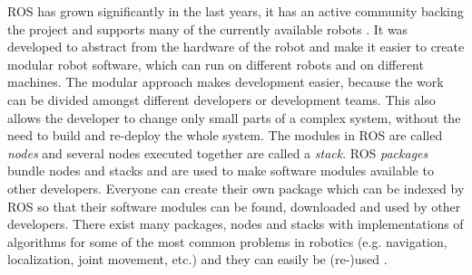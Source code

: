 \begin{figure}[ht]
\centering
{}
\end{figure}

ROS has grown significantly in the last years, it has an active community backing the project and supports many of the currently available robots \cite{Foote2012}. It was developed to abstract from the hardware of the robot and make it easier to create modular robot software, which can run on different robots and on different machines. The modular approach makes development easier, because the work can be divided amongst different developers or development teams. This also allows the developer to change only small parts of a complex system, without the need to build and re-deploy the whole system.
The modules in ROS are called \emph{nodes} and several nodes executed together are called a \emph{stack}. ROS \emph{packages} bundle nodes and stacks and are used to make software modules available to other developers. Everyone can create their own package which can be indexed by ROS so that their software modules can be found, downloaded and used by other developers. There exist many packages, nodes and stacks with implementations of algorithms for some of the most common problems in robotics (e.g. navigation, localization, joint movement, etc.) and they can easily be (re-)used \cite{Cousins2010}.

